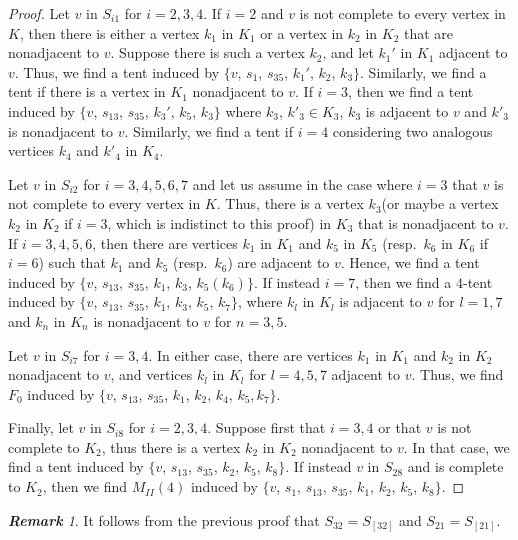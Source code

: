 \documentclass[12pt]{book}
\theoremstyle{plain}
\theoremstyle{remark}
\newtheorem{remark}[teo]{\textbf{\textit{Remark}}}
\begin{document}
\begin{proof}
	Let $v$ in $S_{i1}$ for $i=2,3,4$. If $i=2$ and $v$ is not complete to every vertex in $K$, then there is either a vertex $k_1$ in $K_1$ or a vertex in $k_2$ in $K_2$ that are nonadjacent to $v$.
	  Suppose there is such a vertex $k_2$, and let $k_1'$ in $K_1$ adjacent to $v$. Thus, we find a tent induced by $\{ v$, $s_1$, $s_{35}$, $k_1'$, $k_2$, $k_3 \}$. Similarly, we find a tent if there is a vertex in $K_1$ nonadjacent to $v$.
	  If $i=3$, then we find a tent induced by $\{ v$, $s_{13}$, $s_{35}$, $k_3'$, $k_5$, $k_3 \}$ where $k_3$, $k'_3 \in K_3$, $k_3$ is adjacent to $v$ and $k'_3$ is nonadjacent to $v$. Similarly, we find a tent if $i=4$ considering two analogous vertices $k_4$ and $k'_4$ in $K_4$.

	Let $v$ in $S_{i2}$ for $i=3, 4, 5, 6, 7$ and let us assume in the case where $i=3$ that $v$ is not complete to every vertex in $K$. Thus, there is a vertex $k_3$(or maybe a vertex $k_2$ in $K_2$ if $i=3$, which is indistinct to this proof) in $K_3$ that is nonadjacent to $v$. If $i=3,4,5,6$, then there are vertices $k_1$ in $K_1$ and $k_5$ in $K_5$ (resp.\ $k_6$ in $K_6$ if $i=6$) such that $k_1$ and $k_5$ (resp.\ $k_6$) are adjacent to $v$. Hence, we find a tent induced by $\{ v$, $s_{13}$, $s_{35}$, $k_1$, $k_3$, $k_5 (k_6) \}$.
	If instead $i=7$, then we find a $4$-tent induced by $\{ v$, $s_{13}$, $s_{35}$, $k_1$, $k_3$, $k_5$, $k_7 \}$, where $k_l$ in $K_l$ is adjacent to $v$ for $l=1,7$ and $k_n$ in $K_n$ is nonadjacent to $v$ for $n=3,5$.
	
	Let $v$ in $S_{i7}$ for $i=3,4$. In either case, there are vertices $k_1$ in $K_1$ and $k_2$ in $K_2$ nonadjacent to $v$, and vertices $k_l$ in $K_l$ for $l=4,5,7$ adjacent to $v$.
	Thus, we find $F_0$ induced by $\{ v$, $s_{13}$, $s_{35}$, $k_1$, $k_2$, $k_4$, $k_5, k_7 \}$.
	
	Finally, let $v$ in $S_{i8}$ for $i=2, 3, 4$. Suppose first that $i=3,4$ or that $v$ is not complete to $K_2$, thus there is a vertex $k_2$ in $K_2$ nonadjacent to $v$. In that case, we find a tent induced by $\{ v$, $s_{13}$, $s_{35}$, $k_2$, $k_5$, $k_8 \}$. If instead $v$ in $S_{28}$ and is complete to $K_2$, then we find $M_{II}(4)$ induced by $\{ v$, $s_1$, $s_{13}$, $s_{35}$, $k_1$, $k_2$, $k_5$, $k_8 \}$.
\end{proof}

\begin{remark} \label{obs:coinciden_los_completos}
It follows from the previous proof that $S_{32} = S_{[32]}$ and $S_{21} = S_{[21]}$. 
\end{remark}
\end{document}
